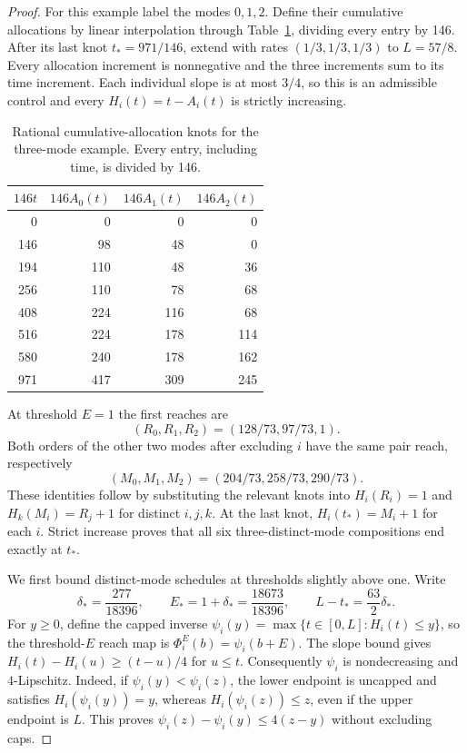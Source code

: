 \begin{proof}
For this example label the modes $0,1,2$. Define their cumulative
allocations by linear interpolation through Table~\ref{tab:n3-knots},
dividing every entry by 146. After its last knot $t_*=971/146$, extend
with rates $(1/3,1/3,1/3)$ to $L=57/8$. Every allocation increment is
nonnegative and the three increments sum to its time increment. Each
individual slope is at most $3/4$, so this is an admissible control and
every $H_i(t)=t-A_i(t)$ is strictly increasing.

\begin{table}[tb]
\centering
\begin{tabular}{rrrr}
\toprule
$146t$ & $146A_0(t)$ & $146A_1(t)$ & $146A_2(t)$\\
\midrule
0&0&0&0\\
146&98&48&0\\
194&110&48&36\\
256&110&78&68\\
408&224&116&68\\
516&224&178&114\\
580&240&178&162\\
971&417&309&245\\
\bottomrule
\end{tabular}
\caption{Rational cumulative-allocation knots for the three-mode example.
Every entry, including time, is divided by 146.}
\label{tab:n3-knots}
\end{table}

At threshold $E=1$ the first reaches are
\[
 (R_0,R_1,R_2)=(128/73,97/73,1).
\]
Both orders of the other two modes after excluding $i$ have the same
pair reach, respectively
\[
 (M_0,M_1,M_2)=(204/73,258/73,290/73).
\]
These identities follow by substituting the relevant knots into
$H_i(R_i)=1$ and $H_k(M_i)=R_j+1$ for distinct $i,j,k$.
At the last knot, $H_i(t_*)=M_i+1$ for each $i$. Strict increase proves
that all six three-distinct-mode compositions end exactly at $t_*$.

We first bound distinct-mode schedules at thresholds slightly above one.
Write
\[
 \delta_*=\frac{277}{18396},\qquad E_*=1+\delta_*
 =\frac{18673}{18396},\qquad
 L-t_*=\frac{63}{2}\delta_*.
\]
For $y\ge0$, define the capped inverse
$\psi_i(y)=\max\{t\in[0,L]:H_i(t)\le y\}$, so the threshold-$E$
reach map is $\Phi_i^E(b)=\psi_i(b+E)$. The slope bound gives
$H_i(t)-H_i(u)\ge(t-u)/4$ for $u\le t$. Consequently $\psi_i$ is
nondecreasing and $4$-Lipschitz. Indeed, if $\psi_i(y)<\psi_i(z)$,
the lower endpoint is uncapped and satisfies $H_i(\psi_i(y))=y$,
whereas $H_i(\psi_i(z))\le z$, even if the upper endpoint is $L$.
This proves $\psi_i(z)-\psi_i(y)\le4(z-y)$ without excluding caps.


\end{proof}
